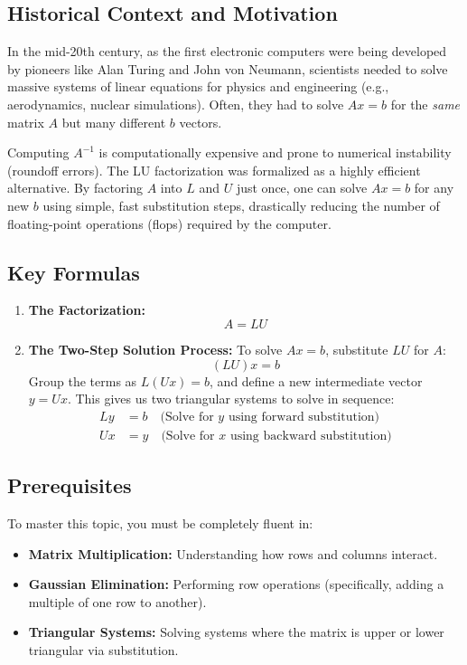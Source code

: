 \documentclass[11pt]{article}
\begin{document}
\subsection{Historical Context and Motivation}
In the mid-20th century, as the first electronic computers were being developed by pioneers like Alan Turing and John von Neumann, scientists needed to solve massive systems of linear equations for physics and engineering (e.g., aerodynamics, nuclear simulations). Often, they had to solve $Ax = b$ for the \textit{same} matrix $A$ but many different $b$ vectors. 

Computing $A^{-1}$ is computationally expensive and prone to numerical instability (roundoff errors). The LU factorization was formalized as a highly efficient alternative. By factoring $A$ into $L$ and $U$ just once, one can solve $Ax = b$ for any new $b$ using simple, fast substitution steps, drastically reducing the number of floating-point operations (flops) required by the computer.

\subsection{Key Formulas}
\begin{enumerate}
    \item \textbf{The Factorization:} \[ A = LU \]
    \item \textbf{The Two-Step Solution Process:} To solve $Ax = b$, substitute $LU$ for $A$:
    \[ (LU)x = b \]
    Group the terms as $L(Ux) = b$, and define a new intermediate vector $y = Ux$. This gives us two triangular systems to solve in sequence:
    \begin{align*}
        Ly &= b \quad \text{(Solve for } y \text{ using forward substitution)} \\
        Ux &= y \quad \text{(Solve for } x \text{ using backward substitution)}
    \end{align*}
\end{enumerate}

\subsection{Prerequisites}
To master this topic, you must be completely fluent in:
\begin{itemize}
    \item \textbf{Matrix Multiplication:} Understanding how rows and columns interact.
    \item \textbf{Gaussian Elimination:} Performing row operations (specifically, adding a multiple of one row to another).
    \item \textbf{Triangular Systems:} Solving systems where the matrix is upper or lower triangular via substitution.
\end{itemize}
\end{document}
